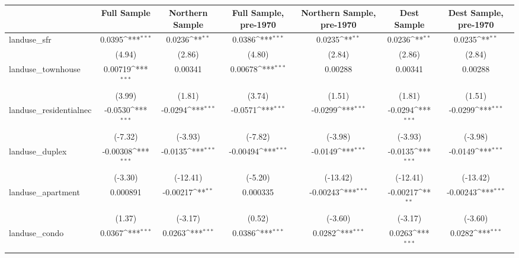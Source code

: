 \begin{table}[htbp]\centering
\def\sym#1{\ifmmode^{#1}\else\(^{#1}\)\fi}
\caption{ \label{tab1}}
\begin{tabular}{l*{6}{c}}
\toprule
                    &\multicolumn{1}{c}{Full Sample}&\multicolumn{1}{c}{Northern Sample}&\multicolumn{1}{c}{Full Sample, pre-1970}&\multicolumn{1}{c}{Northern Sample, pre-1970}&\multicolumn{1}{c}{Dest Sample}&\multicolumn{1}{c}{Dest Sample, pre-1970}\\
\midrule
landuse\_sfr         &      0.0395\sym{***}&      0.0236\sym{**} &      0.0386\sym{***}&      0.0235\sym{**} &      0.0236\sym{**} &      0.0235\sym{**} \\
                    &      (4.94)         &      (2.86)         &      (4.80)         &      (2.84)         &      (2.86)         &      (2.84)         \\
\addlinespace
landuse\_townhouse   &     0.00719\sym{***}&     0.00341         &     0.00678\sym{***}&     0.00288         &     0.00341         &     0.00288         \\
                    &      (3.99)         &      (1.81)         &      (3.74)         &      (1.51)         &      (1.81)         &      (1.51)         \\
\addlinespace
landuse\_residentialnec&     -0.0530\sym{***}&     -0.0294\sym{***}&     -0.0571\sym{***}&     -0.0299\sym{***}&     -0.0294\sym{***}&     -0.0299\sym{***}\\
                    &     (-7.32)         &     (-3.93)         &     (-7.82)         &     (-3.98)         &     (-3.93)         &     (-3.98)         \\
\addlinespace
landuse\_duplex      &    -0.00308\sym{***}&     -0.0135\sym{***}&    -0.00494\sym{***}&     -0.0149\sym{***}&     -0.0135\sym{***}&     -0.0149\sym{***}\\
                    &     (-3.30)         &    (-12.41)         &     (-5.20)         &    (-13.42)         &    (-12.41)         &    (-13.42)         \\
\addlinespace
landuse\_apartment   &    0.000891         &    -0.00217\sym{**} &    0.000335         &    -0.00243\sym{***}&    -0.00217\sym{**} &    -0.00243\sym{***}\\
                    &      (1.37)         &     (-3.17)         &      (0.52)         &     (-3.60)         &     (-3.17)         &     (-3.60)         \\
\addlinespace
landuse\_condo       &      0.0367\sym{***}&      0.0263\sym{***}&      0.0386\sym{***}&      0.0282\sym{***}&      0.0263\sym{***}&      0.0282\sym{***}\\

\end{tabular}
\end{table}
